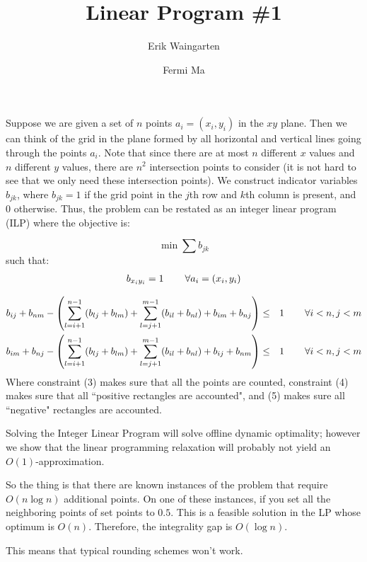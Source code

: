 \documentclass[11pt]{article}
\author{Erik Waingarten \and Fermi Ma}
\title{Linear Program \#1}
\begin{document}
         
\maketitle

Suppose we are given a set of $n$ points $a_i = (x_i, y_i)$ in the $xy$ plane. Then we can think of the grid in the plane formed by all horizontal and vertical lines going through the points $a_i$. Note that since there are at most $n$ different $x$ values and $n$ different $y$ values, there are $n^2$ intersection points to consider (it is not hard to see that we only need these intersection points). We construct indicator variables $b_{jk}$, where $b_{jk} = 1$ if the grid point in the $j$th row and $k$th column is present, and 0 otherwise. Thus, the problem can be restated as an integer linear program (ILP) where the objective is:

\[ \min \sum b_{jk} \]
such that:
\begin{align}
 b_{x_iy_i} = 1 \hspace{.3in} \forall a_i = (x_i, y_i)
\end{align}

\begin{align}
b_{ij} + b_{nm} - \left(\sum_{l=i+1}^{n-1} (b_{lj}+b_{lm}) + \sum_{l=j+1}^{m-1} (b_{il} + b_{nl}) + b_{im} + b_{nj} \right) &\leq& 1 & \hspace{.3in} \forall i<n, j<m \\
b_{im} + b_{nj} - \left(\sum_{l=i+1}^{n-1} (b_{lj}+b_{lm}) + \sum_{l=j+1}^{m-1} (b_{il} + b_{nl}) + b_{ij} + b_{nm} \right) &\leq& 1 & \hspace{.3in} \forall i<n, j<m
\end{align}
Where constraint (3) makes sure that all the points are counted, constraint (4) makes sure that all ``positive rectangles are accounted", and (5) makes sure all ``negative" rectangles are accounted. 

Solving the Integer Linear Program will solve offline dynamic optimality; however we show that the linear programming relaxation will probably not yield an $O(1)$-approximation.

So the thing is that there are known instances of the problem that require $O(n\log n)$ additional points. On one of these instances, if you set all the neighboring points of set points to $0.5$. This is a feasible solution in the LP whose optimum is $O(n)$. Therefore, the integrality gap is $O(\log n)$. 

This means that typical rounding schemes won't work. 
\end{document}
